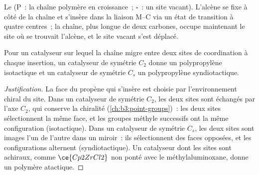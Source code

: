 \begin{omfigure}
\par\medskip

{\small Le  (P~: la chaîne polymère en croissance~; $\square$~: un
site vacant). L'alcène se fixe à côté de la chaîne et s'insère dans la
liaison M--C via un état de transition à quatre centres~; la chaîne, plus
longue de deux carbones, occupe maintenant le site où se trouvait l'alcène,
et le site vacant s'est déplacé.}
\end{omfigure}

\begin{proposition}\label{prop:b3:homogeneous-catalysis:tacticity-symmetry}
Pour un catalyseur  sur lequel la chaîne migre entre deux sites
de coordination à chaque insertion, un catalyseur de symétrie $C_2$ donne un
polypropylène isotactique et un catalyseur de symétrie $C_s$ un polypropylène syndiotactique.
\end{proposition}

\begin{proof}[Justification]
La face du propène qui s'insère est choisie par l'environnement chiral du
site. Dans un catalyseur de symétrie $C_2$, les deux sites sont échangés par l'axe $C_2$,
qui conserve la chiralité (\cref{ch:b3:point-groups})~: les deux sites
sélectionnent la même face, et les groupes méthyle successifs ont la même
configuration (isotactique). Dans un catalyseur de symétrie $C_s$, les deux sites sont images
l'un de l'autre dans un miroir~: ils sélectionnent des faces opposées, et
les configurations alternent (syndiotactique). Un catalyseur dont les sites
sont achiraux, comme $\ce{Cp2ZrCl2}$ non ponté avec le méthylaluminoxane, donne un
polymère atactique.
\end{proof}

